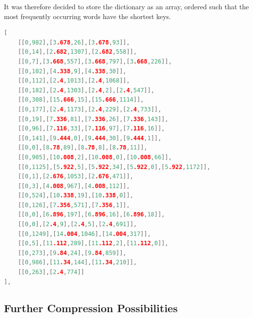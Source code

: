 It was therefore decided to store the dictionary as an array, ordered such that the most frequently occurring words have the shortest keys.

\begin{lstlisting}[label=lst:deltasdata,captionpos=b,float,language=c,stringstyle=\color{blue},basicstyle=\ttfamily\footnotesize,caption={[Excerpt from a paragraph tree using deltas]Excerpt from a JavaScript data file that uses position deltas in the Galley Structure Tree, representing one galley rendering of one paragraph. The first value in each pair is the position delta (in points) and the second is the dictionary key of the associated word.}]
[
    [[0,982],[3.678,26],[3.678,93]],
    [[0,14],[2.682,1307],[2.682,558]],
    [[0,7],[3.668,557],[3.668,797],[3.668,226]],
    [[0,102],[4.338,9],[4.338,30]],
    [[0,112],[2.4,1013],[2.4,1068]],
    [[0,182],[2.4,1303],[2.4,2],[2.4,547]],
    [[0,308],[15.666,15],[15.666,1114]],
    [[0,177],[2.4,1173],[2.4,229],[2.4,733]],
    [[0,19],[7.336,81],[7.336,26],[7.336,143]],
    [[0,96],[7.116,33],[7.116,97],[7.116,16]],
    [[0,141],[9.444,0],[9.444,30],[9.444,1]],
    [[0,0],[8.78,89],[8.78,8],[8.78,11]],
    [[0,905],[10.008,2],[10.008,0],[10.008,66]],
    [[0,1125],[5.922,5],[5.922,34],[5.922,0],[5.922,1172]],
    [[0,1],[2.676,1053],[2.676,471]],
    [[0,3],[4.008,967],[4.008,112]],
    [[0,524],[10.338,19],[10.338,0]],
    [[0,126],[7.356,571],[7.356,1]],
    [[0,0],[6.896,197],[6.896,16],[6.896,18]],
    [[0,0],[2.4,9],[2.4,5],[2.4,691]],
    [[0,1249],[14.004,1046],[14.004,317]],
    [[0,5],[11.112,289],[11.112,2],[11.112,0]],
    [[0,273],[9.84,24],[9.84,859]],
    [[0,986],[11.34,144],[11.34,210]],
    [[0,263],[2.4,774]]
],
\end{lstlisting}

\subsection{Further Compression Possibilities}
\label{sec:deltas}

